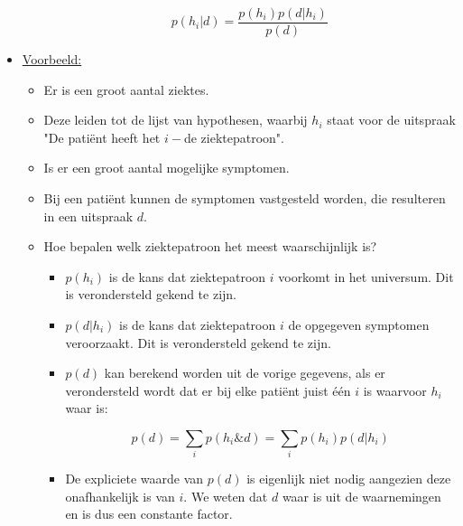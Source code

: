 \begin{itemize}
\begin{itemize}
		$$p(h_i|d) = \frac{p(h_i)p(d|h_i)}{p(d)}$$
	\end{itemize}
	\item \underline{Voorbeeld:}
	\begin{itemize}
		\item Er is een groot aantal ziektes.
		\item Deze leiden tot de lijst van hypothesen, waarbij $h_i$ staat voor de uitspraak "De patiënt heeft het $i-$de ziektepatroon".
		\item Is er een groot aantal mogelijke symptomen.
		\item Bij een patiënt kunnen de symptomen vastgesteld worden, die resulteren in een uitspraak $d$.
		\item Hoe bepalen welk ziektepatroon het meest waarschijnlijk is?
		\begin{itemize}
			\item $p(h_i)$ is de kans dat ziektepatroon $i$ voorkomt in het universum. Dit is verondersteld gekend te zijn.
			\item $p(d|h_i)$ is de kans dat ziektepatroon $i$ de opgegeven symptomen veroorzaakt. Dit is verondersteld gekend te zijn.
			\item $p(d)$ kan berekend worden uit de vorige gegevens, als er verondersteld wordt dat er bij elke patiënt juist één $i$ is waarvoor $h_i$ waar is:
			
			$$p(d) = \sum_i p(h_i\&d) = \sum_i p(h_i)p(d|h_i)$$
			
			\item De expliciete waarde van $p(d)$ is eigenlijk niet nodig aangezien deze onafhankelijk is van $i$. We weten dat $d$ waar is uit de waarnemingen en is dus een constante factor.
		\end{itemize}
	\end{itemize}
	
\end{itemize}
